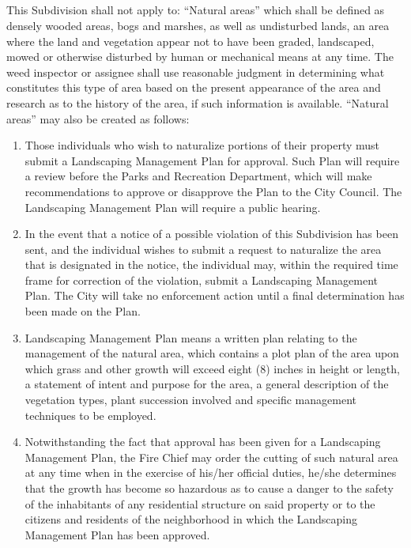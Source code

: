 \documentclass[code.tex]{subfiles}
\begin{document}
\subsection{}
This Subdivision shall not apply to: “Natural areas” which shall be defined as densely wooded areas, bogs and marshes, as well as undisturbed lands, an area where the land and vegetation appear not to have been graded, landscaped, mowed or otherwise disturbed by human or mechanical means at any time. The weed inspector or assignee shall use reasonable judgment in determining what constitutes this type of area based on the present appearance of the area and research as to the history of the area, if such information is available. “Natural areas” may also be created as follows:
\begin{enumerate}[{\indent}1)]
    \item Those individuals who wish to naturalize portions of their property must submit a Landscaping Management Plan for approval.  Such Plan will require a review before the Parks and Recreation Department, which will make recommendations to approve or disapprove the Plan to the City Council.  The Landscaping Management Plan will require a public hearing.
    \item In the event that a notice of a possible violation of this Subdivision has been sent, and the individual wishes to submit a request to naturalize the area that is designated in the notice, the individual may, within the required time frame for correction of the violation, submit a Landscaping Management Plan.  The City will take no enforcement action until a final determination has been made on the Plan.
    \item Landscaping Management Plan means a written plan relating to the management of the natural area, which contains a plot plan of the area upon which grass and other growth will exceed eight (8) inches in height or length, a statement of intent and purpose for the area, a general description of the vegetation types, plant succession involved and specific management techniques to be employed.
    \item Notwithstanding the fact that approval has been given for a Landscaping Management Plan, the Fire Chief may order the cutting of such natural area at any time when in the exercise of his/her official duties, he/she determines that the growth has become so hazardous as to cause a danger to the safety of the inhabitants of any residential structure on said property or to the citizens and residents of the neighborhood in which the Landscaping Management Plan has been approved.
\end{enumerate}
\end{document}
